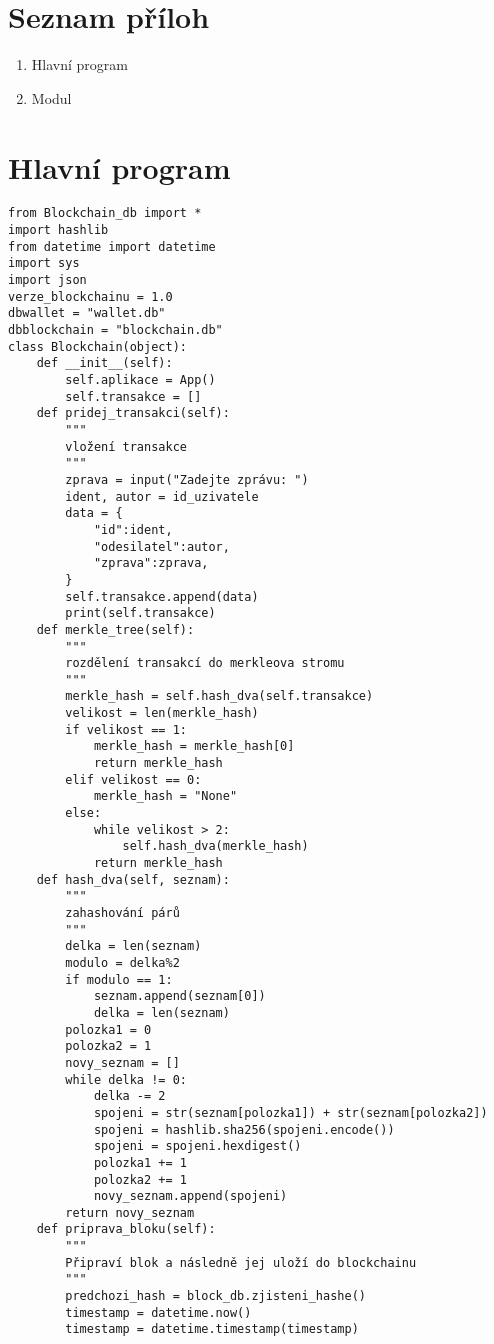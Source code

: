 \documentclass[12pt]{report}			%
\begin{document}
{\begin{appendices}
	\chapter*{Seznam příloh}
	\begin{enumerate}
	\item{Hlavní program}
	\item{Modul}
	\end{enumerate}
	\chapter{Hlavní program}
	\begin{lstlisting}
from Blockchain_db import *
import hashlib
from datetime import datetime
import sys
import json
verze_blockchainu = 1.0
dbwallet = "wallet.db"
dbblockchain = "blockchain.db"
class Blockchain(object):
    def __init__(self):
        self.aplikace = App()
        self.transakce = []
    def pridej_transakci(self):
        """
        vložení transakce
        """
        zprava = input("Zadejte zprávu: ")
        ident, autor = id_uzivatele 
        data = {
            "id":ident,
            "odesilatel":autor,
            "zprava":zprava,
        }
        self.transakce.append(data)
        print(self.transakce)
    def merkle_tree(self):
        """
        rozdělení transakcí do merkleova stromu
        """
        merkle_hash = self.hash_dva(self.transakce)
        velikost = len(merkle_hash)
        if velikost == 1:
            merkle_hash = merkle_hash[0]
            return merkle_hash
        elif velikost == 0:
            merkle_hash = "None"
        else:
            while velikost > 2:
                self.hash_dva(merkle_hash)
            return merkle_hash
    def hash_dva(self, seznam):
        """
        zahashování párů
        """
        delka = len(seznam)
        modulo = delka%2
        if modulo == 1:
            seznam.append(seznam[0])
            delka = len(seznam)
        polozka1 = 0
        polozka2 = 1
        novy_seznam = []
        while delka != 0:
            delka -= 2
            spojeni = str(seznam[polozka1]) + str(seznam[polozka2])
            spojeni = hashlib.sha256(spojeni.encode())
            spojeni = spojeni.hexdigest()
            polozka1 += 1
            polozka2 += 1
            novy_seznam.append(spojeni)
        return novy_seznam
    def priprava_bloku(self):
        """
        Připraví blok a následně jej uloží do blockchainu
        """
        predchozi_hash = block_db.zjisteni_hashe()
        timestamp = datetime.now()
        timestamp = datetime.timestamp(timestamp)

\end{lstlisting}
\end{appendices}}
\end{document}

